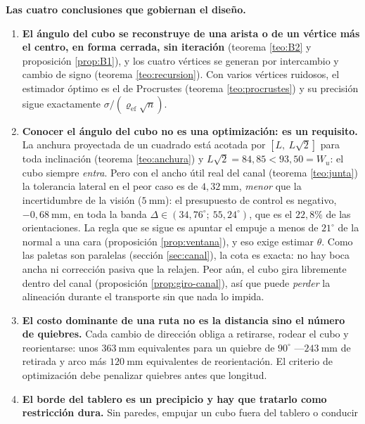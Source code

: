 \documentclass[11pt,a4paper]{article}
\theoremstyle{definition}
\newcommand{\grados}{^{\circ}}
\begin{document}
\begin{resultado}
\textbf{Las cuatro conclusiones que gobiernan el diseño.}
\begin{enumerate}[label=\arabic*.,leftmargin=2.4em,itemsep=4pt]
\item \textbf{El ángulo del cubo se reconstruye de una arista o de un vértice más el
      centro, en forma cerrada, sin iteración} (teorema \ref{teo:B2} y proposición
      \ref{prop:B1}), y los cuatro vértices se generan por intercambio y cambio de
      signo (teorema \ref{teo:recursion}). Con varios vértices ruidosos, el estimador
      óptimo es el de Procrustes (teorema \ref{teo:procrustes}) y su precisión sigue
      exactamente $\sigma/(\varrho_{\mathrm{ef}}\sqrt n)$.
\item \textbf{Conocer el ángulo del cubo no es una optimización: es un requisito.} La
      anchura proyectada de un cuadrado está acotada por $[L,\ L\sqrt2]$ para toda
      inclinación (teorema \ref{teo:anchura}) y $L\sqrt2 = 84{,}85 < 93{,}50 = W_u$: el
      cubo siempre \emph{entra}. Pero con el ancho útil real del canal
      (teorema \ref{teo:junta}) la tolerancia lateral en el peor caso es de
      $4{,}32\ \mathrm{mm}$, \emph{menor} que la incertidumbre de la visión
      ($5\ \mathrm{mm}$): el presupuesto de control es negativo, $-0{,}68\ \mathrm{mm}$,
      en toda la banda $\Delta \in (34{,}76\grados;\ 55{,}24\grados)$, que es el $22{,}8\%$
      de las orientaciones. La regla que se sigue es apuntar el empuje a menos de
      $21\grados$ de la normal a una cara (proposición \ref{prop:ventana}), y eso exige
      estimar $\theta$. Como las paletas son paralelas (sección \ref{sec:canal}), la cota
      es exacta: no hay boca ancha ni corrección pasiva que la relajen. Peor aún, el cubo
      gira libremente dentro del canal (proposición \ref{prop:giro-canal}), así que puede
      \emph{perder} la alineación durante el transporte sin que nada lo impida.
\item \textbf{El costo dominante de una ruta no es la distancia sino el número de
      quiebres.} Cada cambio de dirección obliga a retirarse, rodear el cubo y
      reorientarse: unos $363\ \mathrm{mm}$ equivalentes para un quiebre de
      $90\grados$ ---$243\ \mathrm{mm}$ de retirada y arco más $120\ \mathrm{mm}$
      equivalentes de reorientación. El criterio de optimización debe penalizar quiebres antes que
      longitud.
\item \textbf{El borde del tablero es un precipicio y hay que tratarlo como
      restricción dura.} Sin paredes, empujar un cubo fuera del tablero o conducir

\end{enumerate}
\end{resultado}
\end{document}

